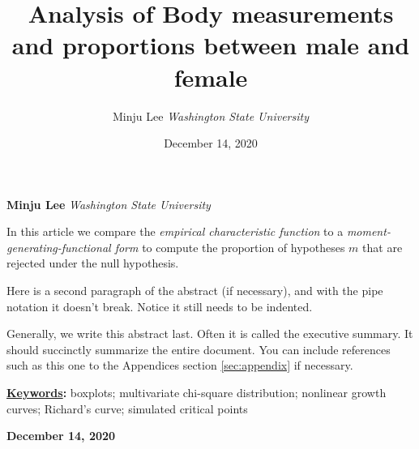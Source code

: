 \documentclass[]{article}
\title{\textbf{\textcolor{WSU.crimson}{Analysis of Body measurements and
proportions between male and female}}  }
\author{\Large Minju
Lee\vspace{0.05in} \newline\normalsize\emph{Washington State
University}  }
\date{December 14, 2020}
\newcommand*{\authorfont}{\fontfamily{phv}\selectfont}
\renewenvironment{abstract}
 {{%
    \setlength{\leftmargin}{0mm}
    \setlength{\rightmargin}{\leftmargin}%
  }%
  \relax}
 {\endlist}
\begin{document}
	
%    


{%
\setlength{\parindent}{0pt}
\thispagestyle{plain}
{\fontsize{18}{20}\selectfont\raggedright 
\maketitle  %

}

{
   \vskip 13.5pt\relax \normalsize\fontsize{11}{12} 
   
\textbf{\authorfont Minju Lee} \hskip 15pt \emph{\small Washington State
University}   

}

}








\begin{abstract}

    \hbox{\vrule height .2pt width 39.14pc}

    \vskip 8.5pt %

\noindent In this article we compare the
\emph{empirical characteristic function} \citep{Tukey:1977, Becker:1988}
to a \emph{moment-generating-functional form} to compute the proportion
of hypotheses \(m\) that are rejected under the null hypothesis.
\vspace{0.25in}

\noindent Here is a second paragraph of the abstract (if necessary), and
with the pipe notation it doesn't break. Notice it still needs to be
indented. \vspace{0.25in}

\noindent Generally, we write this abstract last. Often it is called the
executive summary. It should succinctly summarize the entire document.
You can include references such as this one to the Appendices section
\ref{sec:appendix} if necessary.


\vskip 8.5pt \noindent \textbf{\underline{Keywords}:} boxplots;
multivariate chi-square distribution; nonlinear growth curves; Richard's
curve; simulated critical points \par

    




    
    \hbox{\vrule height .2pt width 39.14pc}
    \vskip 5pt 
    \hfill \textbf{\textcolor{WSU.gray}{ December 14, 2020 } }
    \vskip 5pt 
    
\end{abstract}
\end{document}
